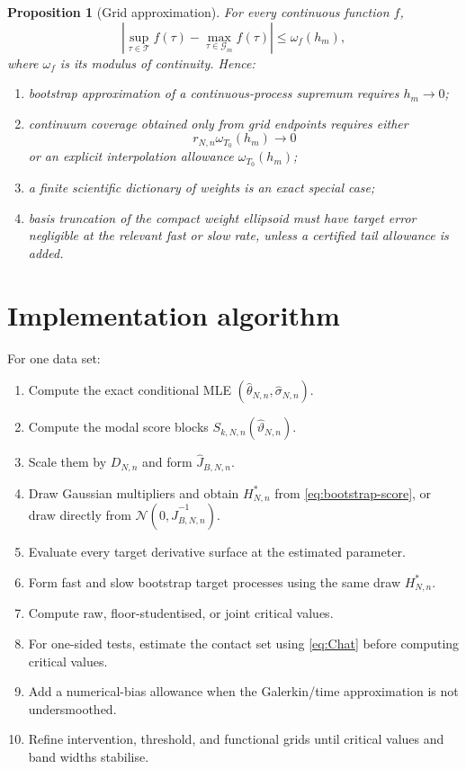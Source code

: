 \documentclass[11pt]{article}
\newtheorem{proposition}[assumption]{Proposition}
\theoremstyle{remark}
\newcommand{\cT}{\mathcal T}
\newcommand{\cG}{\mathcal G}
\newcommand{\thetahat}{\widehat\theta_{N,n}}
\newcommand{\sigmahat}{\widehat\sigma_{N,n}}
\newcommand{\vhat}{\widehat\vartheta_{N,n}}
\newcommand{\Jhat}{\widehat J_{B,N,n}}
\newcommand{\Dmat}{D_{N,n}}
\begin{document}
\begin{proposition}[Grid approximation]\label{prop:grid}
For every continuous function $f$,
\[
 \left|
 \sup_{\tau\in\cT}f(\tau)
 -
 \max_{\tau\in\cG_m}f(\tau)
 \right|
 \le\omega_f(h_m),
\]
where $\omega_f$ is its modulus of continuity. Hence:
\begin{enumerate}[label=(\roman*)]
 \item bootstrap approximation of a continuous-process supremum requires $h_m\to0$;
 \item continuum coverage obtained only from grid endpoints requires either
 \[
 r_{N,n}\omega_{T_0}(h_m)\to0
 \]
 or an explicit interpolation allowance $\omega_{T_0}(h_m)$;
 \item a finite scientific dictionary of weights is an exact special case;
 \item basis truncation of the compact weight ellipsoid must have target error negligible at the relevant fast or slow rate, unless a certified tail allowance is added.
\end{enumerate}
\end{proposition}

\section{Implementation algorithm}

For one data set:
\begin{enumerate}[label=\arabic*.]
 \item Compute the exact conditional MLE $(\thetahat,\sigmahat)$.
 \item Compute the modal score blocks $S_{k,N,n}(\vhat)$.
 \item Scale them by $\Dmat$ and form $\Jhat$.
 \item Draw Gaussian multipliers and obtain $H_{N,n}^*$ from \eqref{eq:bootstrap-score}, or draw directly from $\mathcal N(0,\Jhat^{-1})$.
 \item Evaluate every target derivative surface at the estimated parameter.
 \item Form fast and slow bootstrap target processes using the same draw $H_{N,n}^*$.
 \item Compute raw, floor-studentised, or joint critical values.
 \item For one-sided tests, estimate the contact set using \eqref{eq:Chat} before computing critical values.
 \item Add a numerical-bias allowance when the Galerkin/time approximation is not undersmoothed.
 \item Refine intervention, threshold, and functional grids until critical values and band widths stabilise.
\end{enumerate}
\end{document}
